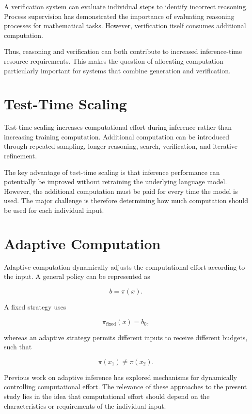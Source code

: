 \documentclass[12pt,a4paper,titlepage]{report}
\begin{document}
A verification system can evaluate individual steps to identify incorrect reasoning. Process supervision has demonstrated the importance of evaluating reasoning processes for mathematical tasks. However, verification itself consumes additional computation.

Thus, reasoning and verification can both contribute to increased inference-time resource requirements. This makes the question of allocating computation particularly important for systems that combine generation and verification.

\section{Test-Time Scaling}

Test-time scaling increases computational effort during inference rather than increasing training computation. Additional computation can be introduced through repeated sampling, longer reasoning, search, verification, and iterative refinement.

The key advantage of test-time scaling is that inference performance can potentially be improved without retraining the underlying language model. However, the additional computation must be paid for every time the model is used. The major challenge is therefore determining how much computation should be used for each individual input.

\section{Adaptive Computation}

Adaptive computation dynamically adjusts the computational effort according to the input. A general policy can be represented as

\begin{equation}
b=\pi(x).
\end{equation}

A fixed strategy uses

\begin{equation}
\pi_{\mathrm{fixed}}(x)=b_0,
\end{equation}

whereas an adaptive strategy permits different inputs to receive different budgets, such that

\begin{equation}
\pi(x_1)\neq\pi(x_2).
\end{equation}

Previous work on adaptive inference has explored mechanisms for dynamically controlling computational effort. The relevance of these approaches to the present study lies in the idea that computational effort should depend on the characteristics or requirements of the individual input.
\end{document}
